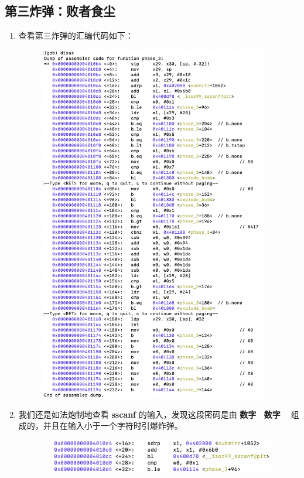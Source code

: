     \subsection{第三炸弹：败者食尘}
        \begin{enumerate}
            \item 查看第三炸弹的汇编代码如下：
                \begin{figure}[htbp]
                    \centering
                    \includegraphics*[width = 10cm]{s3_0.png}
                \end{figure}
            \newpage
            \item 我们还是如法炮制地查看 \textbf{sscanf} 的输入，发现这段密码是由 \textbf{数字 \ 数字 \ } 组成的，并且在输入小于一个字符时引爆炸弹。
                \begin{figure}[htbp]
                    \hspace*{1cm}
                    \includegraphics*[width = 12cm]{s3_1_0.png} \\ 

\end{figure}
\end{enumerate}
